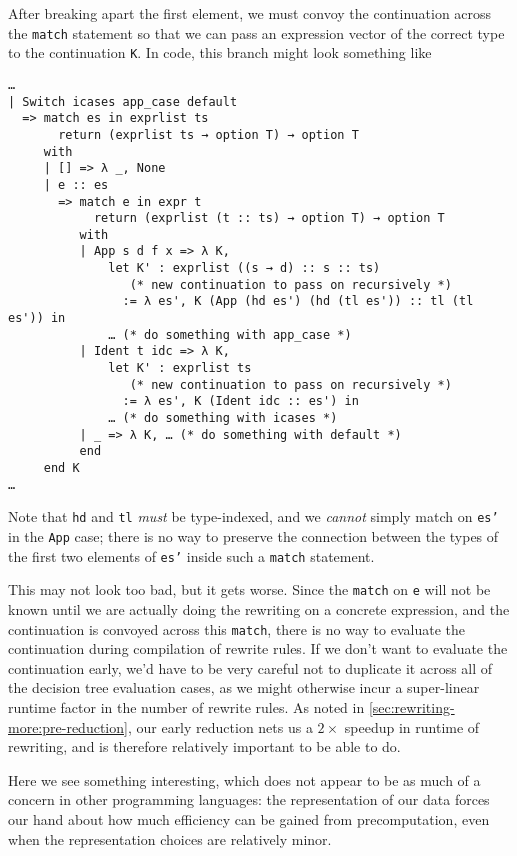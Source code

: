 After breaking apart the first element, we must convoy the continuation across the \texttt{match} statement so that we can pass an expression vector of the correct type to the continuation \texttt{K}.
In code, this branch might look something like
\begin{verbatim}
…
| Switch icases app_case default
  => match es in exprlist ts
       return (exprlist ts → option T) → option T
     with
     | [] => λ _, None
     | e :: es
       => match e in expr t
            return (exprlist (t :: ts) → option T) → option T
          with
          | App s d f x => λ K,
              let K' : exprlist ((s → d) :: s :: ts)
                 (* new continuation to pass on recursively *)
                := λ es', K (App (hd es') (hd (tl es')) :: tl (tl es')) in
              … (* do something with app_case *)
          | Ident t idc => λ K,
              let K' : exprlist ts
                 (* new continuation to pass on recursively *)
                := λ es', K (Ident idc :: es') in
              … (* do something with icases *)
          | _ => λ K, … (* do something with default *)
          end
     end K
…
\end{verbatim}
Note that \texttt{hd} and \texttt{tl} \emph{must} be type-indexed, and we \emph{cannot} simply match on \texttt{es'} in the \texttt{App} case;
there is no way to preserve the connection between the types of the first two elements of \texttt{es'} inside such a \texttt{match} statement.

This may not look too bad, but it gets worse.
Since the \texttt{match} on \texttt{e} will not be known until we are actually doing the rewriting on a concrete expression, and the continuation is convoyed across this \texttt{match}, there is no way to evaluate the continuation during compilation of rewrite rules.
If we don't want to evaluate the continuation early, we'd have to be very careful not to duplicate it across all of the decision tree evaluation cases, as we might otherwise incur a super-linear runtime factor in the number of rewrite rules.
As noted in \autoref{sec:rewriting-more:pre-reduction}, our early reduction nets us a $2\times$ speedup in runtime of rewriting, and is therefore relatively important to be able to do.

Here we see something interesting, which does not appear to be as much of a concern in other programming languages:
the representation of our data forces our hand about how much efficiency can be gained from precomputation, even when the representation choices are relatively minor.

